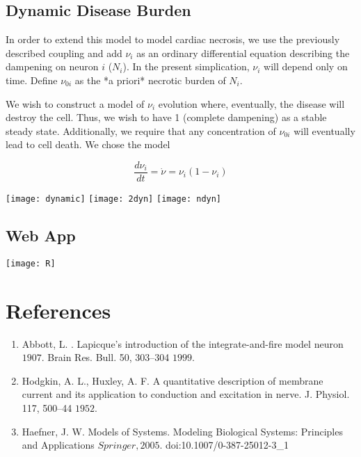 \documentclass[11pt]{report}
\begin{document}
\section{Dynamic Disease Burden} %
\label{sub:dynamic_disease_burden}

In order to extend this model to model cardiac necrosis, we use the previously described coupling and add $\nu_i$ as an ordinary differential equation describing the dampening on neuron $i$ ($N_i$). In the present simplication, $\nu_i$ will depend only on time. Define $\nu_{0i}$ as the *a priori* necrotic burden of $N_i$. 

We wish to construct a model of $\nu_{i}$ evolution where, eventually, the disease will destroy the cell. Thus, we wish to have 1 (complete dampening) as a stable steady state. Additionally, we require that any concentration of $\nu_{0i}$ will eventually lead to cell death. We chose the model

$$ \frac{d \nu_i}{dt} = \dot{\nu} = \nu_i (1 - \nu_i) $$

\texttt{[image: dynamic]}
\texttt{[image: 2dyn]}
\texttt{[image: ndyn]}


\section{Web App} %
\label{sub:web_app}


\texttt{[image: R]}
\newpage

\chapter{References} %
\label{sec:references}

\begin{enumerate}
	\item Abbott, L. . Lapicque’s introduction of the integrate-and-fire model neuron \(1907\). Brain Res. Bull. 50, 303–304 \(1999\).
	\item Hodgkin, A. L., Huxley, A. F. A quantitative description of membrane current and its application to conduction and excitation in nerve. J. Physiol. 117, 500–44 \(1952\).
	\item Haefner, J. W. Models of Systems. Modeling Biological Systems: Principles and Applications \(Springer, 2005\). doi:10.1007/0-387-25012-3\_1
\end{enumerate}


\end{document}
